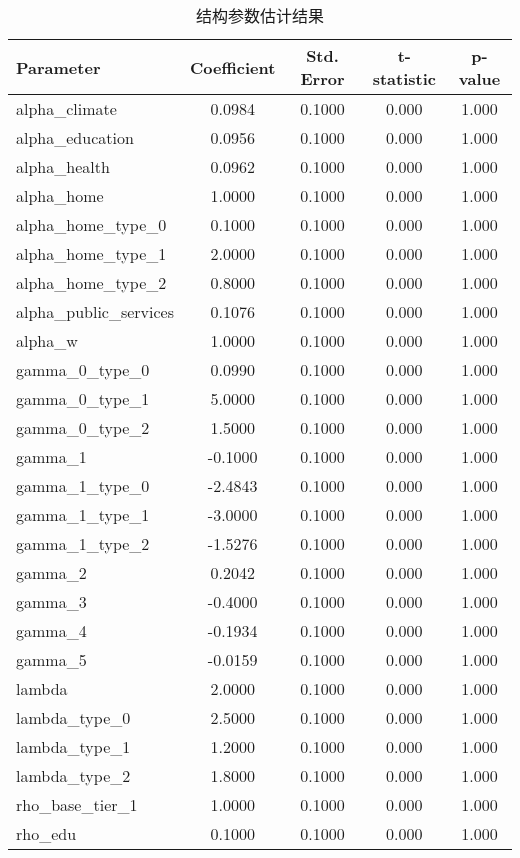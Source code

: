 \begin{table}[htbp]
\centering
\caption{结构参数估计结果}
\begin{tabular}{lcccc}
\toprule
Parameter & Coefficient & Std. Error & t-statistic & p-value \\
\midrule
alpha_climate & 0.0984 & 0.1000 & 0.000 & 1.000 \\
alpha_education & 0.0956 & 0.1000 & 0.000 & 1.000 \\
alpha_health & 0.0962 & 0.1000 & 0.000 & 1.000 \\
alpha_home & 1.0000 & 0.1000 & 0.000 & 1.000 \\
alpha_home_type_0 & 0.1000 & 0.1000 & 0.000 & 1.000 \\
alpha_home_type_1 & 2.0000 & 0.1000 & 0.000 & 1.000 \\
alpha_home_type_2 & 0.8000 & 0.1000 & 0.000 & 1.000 \\
alpha_public_services & 0.1076 & 0.1000 & 0.000 & 1.000 \\
alpha_w & 1.0000 & 0.1000 & 0.000 & 1.000 \\
gamma_0_type_0 & 0.0990 & 0.1000 & 0.000 & 1.000 \\
gamma_0_type_1 & 5.0000 & 0.1000 & 0.000 & 1.000 \\
gamma_0_type_2 & 1.5000 & 0.1000 & 0.000 & 1.000 \\
gamma_1 & -0.1000 & 0.1000 & 0.000 & 1.000 \\
gamma_1_type_0 & -2.4843 & 0.1000 & 0.000 & 1.000 \\
gamma_1_type_1 & -3.0000 & 0.1000 & 0.000 & 1.000 \\
gamma_1_type_2 & -1.5276 & 0.1000 & 0.000 & 1.000 \\
gamma_2 & 0.2042 & 0.1000 & 0.000 & 1.000 \\
gamma_3 & -0.4000 & 0.1000 & 0.000 & 1.000 \\
gamma_4 & -0.1934 & 0.1000 & 0.000 & 1.000 \\
gamma_5 & -0.0159 & 0.1000 & 0.000 & 1.000 \\
lambda & 2.0000 & 0.1000 & 0.000 & 1.000 \\
lambda_type_0 & 2.5000 & 0.1000 & 0.000 & 1.000 \\
lambda_type_1 & 1.2000 & 0.1000 & 0.000 & 1.000 \\
lambda_type_2 & 1.8000 & 0.1000 & 0.000 & 1.000 \\
rho_base_tier_1 & 1.0000 & 0.1000 & 0.000 & 1.000 \\
rho_edu & 0.1000 & 0.1000 & 0.000 & 1.000 \\

\end{tabular}
\end{table}
